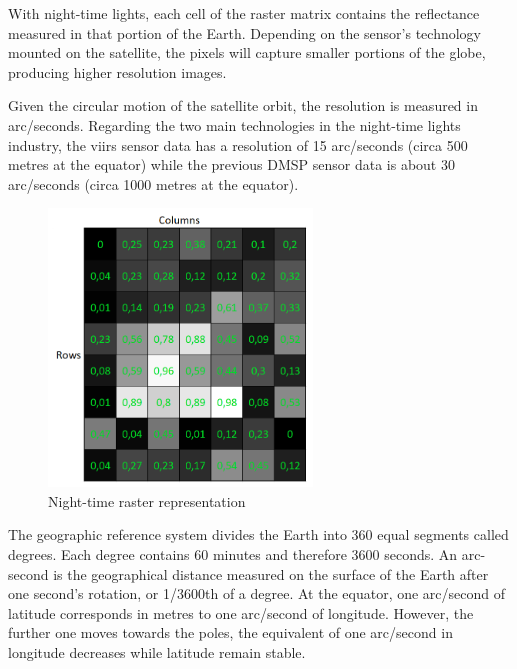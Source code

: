 With night-time lights, each cell of the raster matrix contains the reflectance measured in that portion of the Earth.
Depending on the sensor's technology mounted on the satellite, the pixels will capture smaller portions of the globe, producing higher resolution images. 

Given the circular motion of the satellite orbit, the resolution is measured in arc/seconds. Regarding the two main technologies in the night-time lights industry, the viirs sensor data has a resolution of 15 arc/seconds (circa 500 metres at the equator) while the previous DMSP sensor data is about 30 arc/seconds (circa 1000 metres at the equator). 
\begin{figure}[h]
    \begin{center}
    \includegraphics[width=7cm]{images/raster_night.png}
    \end{center}
    \caption{Night-time raster representation}
\end{figure}
The geographic reference system divides the Earth into 360 equal segments called degrees. Each degree contains 60 minutes and therefore 3600 seconds.
An arc-second is the geographical distance measured on the surface of the Earth after one second's rotation, or 1/3600th of a degree.
At the equator, one arc/second of latitude corresponds in metres to one arc/second of longitude. However, the further one moves towards the poles, the equivalent of one arc/second in longitude decreases while latitude remain stable.
  
